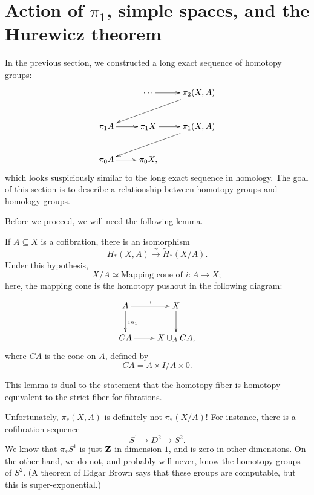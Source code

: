 \section{Action of $\pi_1$, simple spaces, and the Hurewicz theorem}
In the previous section, we constructed a long exact sequence of homotopy groups:
\begin{equation*}
    \xymatrix{
	& \cdots\ar[r] & \pi_2 (X,A)\ar[dll]\\
	\pi_1 A\ar[r] & \pi_1 X\ar[r] & \pi_1 (X,A)\ar[dll]\\
	\pi_0 A\ar[r] & \pi_0 X, & 
    }
\end{equation*}
which looks suspiciously similar to the long exact sequence in homology.
The goal of this section is to describe a relationship between homotopy groups and homology groups.

Before we proceed, we will need the following lemma.
\begin{lemma}[Excision]
    If $A\subseteq X$ is a cofibration, there is an isomorphism
    $$H_\ast(X,A)\xrightarrow{\simeq}\widetilde{H}_\ast(X/A).$$
    Under this hypothesis,
    $$X/A\simeq\text{Mapping cone of }i:A\to X;$$
    here, the mapping cone is the homotopy pushout in the following diagram:
    \begin{equation*}
	\xymatrix{
	    A\ar[r]^i\ar[d]^{in_1} & X\ar[d]\\
	    CA\ar[r] & X\cup_A CA,
	    }
    \end{equation*}
    where $CA$ is the cone on $A$, defined by
    $$CA = A\times I/A\times 0.$$
\end{lemma}
This lemma is dual to the statement that the homotopy fiber is homotopy equivalent to the strict fiber for fibrations.

Unfortunately, $\pi_\ast(X,A)$ is definitely not $\pi_\ast(X/A)$!
For instance, there is a cofibration sequence
$$S^1\to D^2\to S^2.$$
We know that $\pi_\ast S^1$ is just $\mathbf Z$ in dimension $1$, and is zero in other dimensions.
On the other hand, we do not, and probably will never, know the homotopy groups of $S^2$.
(A theorem of Edgar Brown  says that these groups are computable, but this is super-exponential.)

